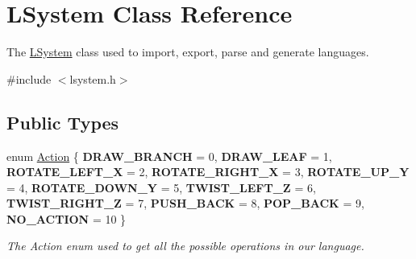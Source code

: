 \hypertarget{classLSystem}{}\section{L\+System Class Reference}
\label{classLSystem}


The \hyperlink{classLSystem}{L\+System} class used to import, export, parse and generate languages.  




{\ttfamily \#include $<$lsystem.\+h$>$}

\subsection*{Public Types}
\begin{DoxyCompactItemize}
\item 
\mbox{\label{classLSystem_a51a104d178453025feb01bd5c81298c7}} 
enum \hyperlink{classLSystem_a51a104d178453025feb01bd5c81298c7}{Action} \{ \newline
{\bfseries D\+R\+A\+W\+\_\+\+B\+R\+A\+N\+CH} = 0, 
{\bfseries D\+R\+A\+W\+\_\+\+L\+E\+AF} = 1, 
{\bfseries R\+O\+T\+A\+T\+E\+\_\+\+L\+E\+F\+T\+\_\+X} = 2, 
{\bfseries R\+O\+T\+A\+T\+E\+\_\+\+R\+I\+G\+H\+T\+\_\+X} = 3, 
\newline
{\bfseries R\+O\+T\+A\+T\+E\+\_\+\+U\+P\+\_\+Y} = 4, 
{\bfseries R\+O\+T\+A\+T\+E\+\_\+\+D\+O\+W\+N\+\_\+Y} = 5, 
{\bfseries T\+W\+I\+S\+T\+\_\+\+L\+E\+F\+T\+\_\+Z} = 6, 
{\bfseries T\+W\+I\+S\+T\+\_\+\+R\+I\+G\+H\+T\+\_\+Z} = 7, 
\newline
{\bfseries P\+U\+S\+H\+\_\+\+B\+A\+CK} = 8, 
{\bfseries P\+O\+P\+\_\+\+B\+A\+CK} = 9, 
{\bfseries N\+O\+\_\+\+A\+C\+T\+I\+ON} = 10
 \}\begin{DoxyCompactList}\small\item\em The Action enum used to get all the possible operations in our language. \end{DoxyCompactList}
\end{DoxyCompactItemize}
